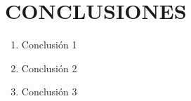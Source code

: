 \cleardoublepage{}
\chapter*{CONCLUSIONES}
\begin{enumerate}

\item Conclusión 1

\item Conclusión 2

\item Conclusión 3

\end{enumerate}
